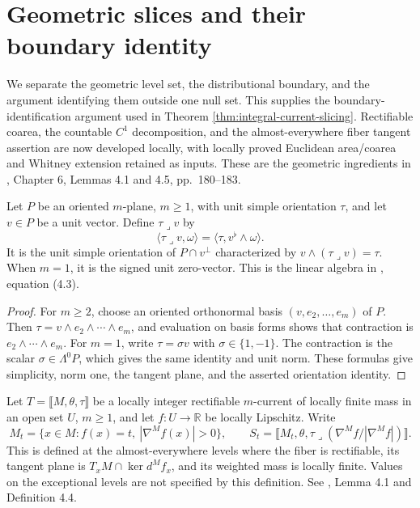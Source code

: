 \chapter{Geometric slices and their boundary identity}\label{sec:geometric-current-slices}
We separate the geometric level set, the distributional boundary, and the argument identifying them outside one null set. This supplies the boundary-identification argument used in Theorem \ref{thm:integral-current-slicing}. Rectifiable coarea, the countable $C^1$ decomposition, and the almost-everywhere fiber tangent assertion are now developed locally, with locally proved Euclidean area/coarea and Whitney extension retained as inputs. These are the geometric ingredients in \cite{Sim18}, Chapter 6, Lemmas 4.1 and 4.5, pp.~180--183.

\begin{lemma}\label{lem:slice-unit-orientation}
Let $P$ be an oriented $m$-plane, $m\geq1$, with unit simple orientation $\tau$, and let $v\in P$ be a unit vector. Define $\tau\mathbin{\lrcorner}v$ by
\[
 \langle\tau\mathbin{\lrcorner}v,\omega\rangle
 =\langle\tau,v^\flat\wedge\omega\rangle.
\]
It is the unit simple orientation of $P\cap v^\perp$ characterized by $v\wedge(\tau\mathbin{\lrcorner}v)=\tau$. When $m=1$, it is the signed unit zero-vector. This is the linear algebra in \cite{Sim18}, equation (4.3).
\end{lemma}
\begin{proof}
For $m\geq2$, choose an oriented orthonormal basis $(v,e_2,\ldots,e_m)$ of $P$. Then $\tau=v\wedge e_2\wedge\cdots\wedge e_m$, and evaluation on basis forms shows that contraction is $e_2\wedge\cdots\wedge e_m$. For $m=1$, write $\tau=\sigma v$ with $\sigma\in\{1,-1\}$. The contraction is the scalar $\sigma\in\Lambda^0P$, which gives the same identity and unit norm. These formulas give simplicity, norm one, the tangent plane, and the asserted orientation identity.
\end{proof}

\begin{definition}\label{def:geometric-level-current}
Let $T=\llbracket M,\theta,\tau\rrbracket$ be a locally integer rectifiable $m$-current of locally finite mass in an open set $U$, $m\geq1$, and let $f:U\to\mathbb R$ be locally Lipschitz. Write
\[
 M_t=\{x\in M:f(x)=t,\ |\nabla^Mf(x)|>0\},\qquad
 S_t=\llbracket M_t,\theta,\tau\mathbin{\lrcorner}
             (\nabla^Mf/|\nabla^Mf|)\rrbracket.
\]
This is defined at the almost-everywhere levels where the fiber is rectifiable, its tangent plane is $T_xM\cap\ker d^Mf_x$, and its weighted mass is locally finite. Values on the exceptional levels are not specified by this definition. See \cite{Sim18}, Lemma 4.1 and Definition 4.4.
\end{definition}

